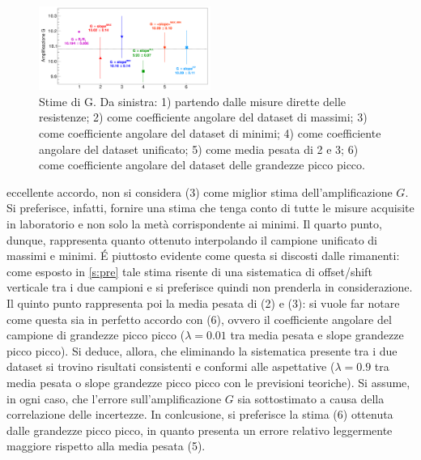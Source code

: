 \documentclass[a4paper,11pt]{article} %
\begin{document}
\begin{figure}
	\centering
	\includegraphics[width=0.5\textwidth]{../Plots/Report_Plots/opamp_comp_BIG.png}
	\caption{\footnotesize Stime di G. Da sinistra: 1) partendo dalle misure dirette delle resistenze; 2) come
	coefficiente angolare del dataset di massimi; 3) come coefficiente angolare del dataset di minimi; 4) come
	coefficiente angolare del dataset unificato; 5) come media pesata di 2 e 3; 6) come coefficiente angolare del
	dataset delle grandezze picco picco.}
	\label{i:opamp_comp}
\end{figure}

\noindent eccellente accordo, non si considera (3) come miglior stima dell'amplificazione $G$. Si preferisce, infatti,
fornire una stima che tenga conto di tutte le misure acquisite in laboratorio e non solo la metà corrispondente ai
minimi. Il quarto punto, dunque, rappresenta quanto ottenuto interpolando il campione unificato di massimi e minimi. É
piuttosto evidente come questa si discosti dalle rimanenti: come esposto in \autoref{s:pre} tale stima risente di una
sistematica di offset/shift verticale tra i due campioni e si preferisce quindi non prenderla in considerazione. Il
quinto punto rappresenta poi la media pesata di (2) e (3): si vuole far notare come questa sia in perfetto accordo con
(6), ovvero il coefficiente angolare del campione di grandezze picco picco ($\lambda=0.01$ tra media pesata e slope
grandezze picco picco). Si deduce, allora, che eliminando la sistematica presente tra i due dataset si trovino risultati
consistenti e conformi alle aspettative ($\lambda = 0.9$ tra media pesata o slope grandezze picco picco con le
previsioni teoriche). Si assume, in ogni caso, che l'errore sull'amplificazione $G$ sia sottostimato a causa della
correlazione delle incertezze. In conlcusione, si preferisce la stima (6) ottenuta dalle grandezze picco picco, in
quanto presenta un errore relativo leggermente maggiore rispetto alla media pesata (5).


\end{document}
